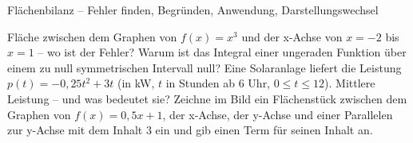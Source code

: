 \begin{aufgabe}{Flächenbilanz – Fehler finden, Begründen, Anwendung, Darstellungswechsel}
\begin{teile}
\teil Fläche zwischen dem Graphen von $f(x) = x^3$ und der x-Achse von $x = -2$ bis $x = 1$ – wo ist der Fehler? 
\teil Warum ist das Integral einer ungeraden Funktion über einem zu null symmetrischen Intervall null?
\teil Eine Solaranlage liefert die Leistung $p(t) = -0{,}25t^2 + 3t$ (in kW, $t$ in Stunden ab 6 Uhr, $0 \le t \le 12$). Mittlere Leistung – und was bedeutet sie?
\teil Zeichne im Bild ein Flächenstück zwischen dem Graphen von $f(x) = 0{,}5x + 1$, der x-Achse, der y-Achse und einer Parallelen zur y-Achse mit dem Inhalt $3$ ein und gib einen Term für seinen Inhalt an.

\begin{ksys}[xmin=-1,xmax=5,ymin=-1,ymax=5,ablesen]\end{ksys}
\end{teile}
\end{aufgabe}
